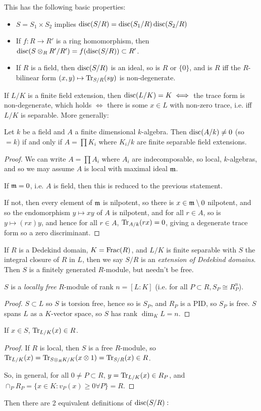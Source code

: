 \documentclass[10pt,a4paper]{article}
\begin{document}
This has the following basic properties:
\begin{itemize}
  \item $S = S_1 \times S_2$ implies $\operatorname{disc}(S/R) = \operatorname{disc}(S_1/R)\operatorname{disc}(S_2/R)$
  \item If $f:R \to R'$ is a ring homomorphism, then $\operatorname{disc}(S\otimes_R R'/R') = f(\operatorname{disc}(S/R))\subset R'$.
  \item If $R$ is a field, then $\operatorname{disc}(S/R)$ is an ideal, so is $R$ or $\{0\}$, and is $R$ iff the $R$-bilinear form $(x,y)\mapsto \operatorname{Tr}_{S/R}(sy)$ is non-degenerate.
\end{itemize}
If $L/K$ is a finite field extension, then $\operatorname{disc}(L/K) = K \iff$ the trace form is non-degenerate, which holds $\iff$ there is some $x \in L$ with non-zero trace, i.e. iff $L/K$ is separable. More generally:
\begin{theorem}
  Let $k$ be a field and $A$ a finite dimensional $k$-algebra. Then $\operatorname{disc}(A/k) \neq 0$ (so $=k$) if and only if $A = \prod K_i$ where $K_i/k$ are finite separable field extensions.
\end{theorem}
\begin{proof}
  We can write $A = \prod A_i$ where $A_i$ are indecomposable, so local, $k$-algebras, and so we may assume $A$ is local with maximal ideal $\mathfrak{m}$.

  If $\mathfrak{m} = 0$, i.e. $A$ is field, then this is reduced to the previous statement.

  If not, then every element of $\mathfrak{m}$ is nilpotent, so there is $x \in \mathfrak{m}\setminus 0$ nilpotent, and so the endomorphism $y \mapsto xy$ of $A$ is nilpotent, and for all $r \in A$, so is $y\mapsto (rx)y$, and hence for all $r \in A$, $\operatorname{Tr}_{A/k}(rx) = 0$, giving a degenerate trace form so a zero discriminant.
\end{proof}
If $R$ is a Dedekind domain, $K = \operatorname{Frac}(R)$, and $L/K$ is finite separable with $S$ the integral closure of $R$ in $L$, then we say $S/R$ is an \emph{extension of Dedekind domains}. Then $S$ is a finitely generated $R$-module, but needn't be free.
\begin{proposition}
  $S$ is a \emph{locally free} $R$-module of rank $n = [L:K]$ (i.e. for all $P \subset R, S_P \cong R_P^n$).
\end{proposition}
\begin{proof}
  $S \subset L$ so $S$ is torsion free, hence so is $S_P$, and $R_P$ is a PID, so $S_P$ is free. $S$ spans $L$ as a $K$-vector space, so $S$ has rank $\dim_K L = n$.
\end{proof}
\begin{lemma}
  If $x \in S$, $\operatorname{Tr}_{L/K}(x) \in R$.
\end{lemma}
\begin{proof}
  If $R$ is local, then $S$ is a free $R$-module, so $\operatorname{Tr}_{L/K}(x) = \operatorname{Tr}_{S\otimes_R K/K}(x\otimes 1) = \operatorname{Tr}_{S/R}(x) \in R$.

  So, in general, for all $0 \neq P \subset R$, $y = \operatorname{Tr}_{L/K}(x) \in R_P$, and $\cap_P R_P = \{x \in K : v_P(x) \geq 0 \forall P\} = R$.
\end{proof}
Then there are 2 equivalent definitions of $\operatorname{disc}(S/R):$
\end{document}
